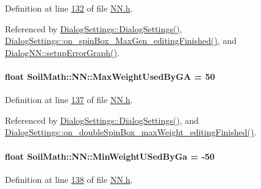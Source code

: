 Definition at line \hyperlink{_n_n_8h_source_l00132}{132} of file \hyperlink{_n_n_8h_source}{N\+N.\+h}.



Referenced by \hyperlink{dialogsettings_8cpp_source_l00005}{Dialog\+Settings\+::\+Dialog\+Settings()}, \hyperlink{dialogsettings_8cpp_source_l00421}{Dialog\+Settings\+::on\+\_\+spin\+Box\+\_\+\+Max\+Gen\+\_\+editing\+Finished()}, and \hyperlink{dialognn_8cpp_source_l00058}{Dialog\+N\+N\+::setup\+Error\+Graph()}.

\hypertarget{class_soil_math_1_1_n_n_a2e6360ebc99e10072eb378f9d7f2e915}{}
\paragraph[{Max\+Weight\+Used\+By\+G\+A}]{\setlength{\rightskip}{0pt plus 5cm}float Soil\+Math\+::\+N\+N\+::\+Max\+Weight\+Used\+By\+G\+A = 50}\label{class_soil_math_1_1_n_n_a2e6360ebc99e10072eb378f9d7f2e915}


Definition at line \hyperlink{_n_n_8h_source_l00137}{137} of file \hyperlink{_n_n_8h_source}{N\+N.\+h}.



Referenced by \hyperlink{dialogsettings_8cpp_source_l00005}{Dialog\+Settings\+::\+Dialog\+Settings()}, and \hyperlink{dialogsettings_8cpp_source_l00441}{Dialog\+Settings\+::on\+\_\+double\+Spin\+Box\+\_\+max\+Weight\+\_\+editing\+Finished()}.

\hypertarget{class_soil_math_1_1_n_n_a653c42b4f2fe2f685d5f4e922e0126b2}{}
\paragraph[{Min\+Weight\+U\+Sed\+By\+Ga}]{\setlength{\rightskip}{0pt plus 5cm}float Soil\+Math\+::\+N\+N\+::\+Min\+Weight\+U\+Sed\+By\+Ga = -\/50}\label{class_soil_math_1_1_n_n_a653c42b4f2fe2f685d5f4e922e0126b2}


Definition at line \hyperlink{_n_n_8h_source_l00138}{138} of file \hyperlink{_n_n_8h_source}{N\+N.\+h}.



